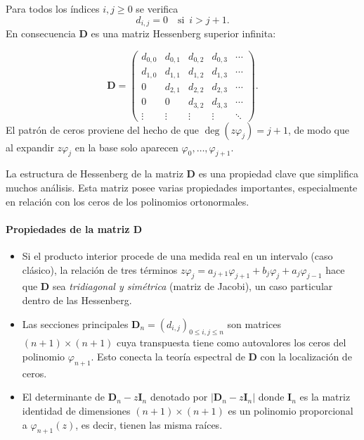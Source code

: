 \begin{proposition}\label{prop:matriz_hessenberg}
  Para todos los índices \(i,j\ge0\) se verifica
  \[
    d_{i,j}=0
    \quad\text{si }\,i>j+1.
  \]
  En consecuencia
  \(\mathbf{D}\) es una matriz Hessenberg superior infinita:

  \[
    \mathbf{D}=\begin{pmatrix}
      d_{0,0} & d_{0,1} & d_{0,2} & d_{0,3} & \cdots \\
      d_{1,0} & d_{1,1} & d_{1,2} & d_{1,3} & \cdots \\
      0       & d_{2,1} & d_{2,2} & d_{2,3} & \cdots \\
      0       & 0       & d_{3,2} & d_{3,3} & \cdots \\
      \vdots  & \vdots  & \vdots  & \vdots  & \ddots
    \end{pmatrix}.
  \]
  El patrón de ceros proviene del hecho de que
  \(\deg(z\varphi_j)=j+1\), de modo que al expandir \(z\varphi_j\) en la base
  solo aparecen \(\varphi_0,\dots,\varphi_{j+1}\).
\end{proposition}

La estructura de Hessenberg de la matriz $\mathbf{D}$ es una propiedad clave que simplifica muchos análisis. Esta matriz posee varias propiedades importantes, especialmente en relación con los ceros de los polinomios ortonormales.

\paragraph{Propiedades de la matriz $\mathbf{D}$}
\begin{itemize}
  \item Si el producto interior procede de una medida real en un intervalo
        (caso clásico), la relación de tres términos
        \(z\varphi_j=a_{j+1}\varphi_{j+1}+b_j\varphi_j+a_j\varphi_{j-1}\)
        hace que \(\mathbf{D}\) sea \emph{tridiagonal y simétrica} (matriz de Jacobi),
        un caso particular dentro de las Hessenberg.
  \item Las secciones principales
        \(\mathbf{D}_n=(d_{i,j})_{0\le i,j\le n}\) son matrices \((n+1)\times(n+1)\)
        cuya transpuesta tiene como autovalores los ceros del polinomio
        \(\varphi_{n+1}\).
        Esto conecta la teoría espectral de \(\mathbf{D}\) con la localización de ceros.
  \item El determinante de $\mathbf{D}_n -z \mathbf{I}_n$ denotado por $\vert \mathbf{D}_n -z \mathbf{I}_n\vert $ donde $\mathbf{I}_n$ es la matriz identidad de dimensiones $(n+1)\times (n+1)$ es un polinomio proporcional a $\varphi_{n+1}(z)$, es decir, tienen las misma raíces.
\end{itemize}

